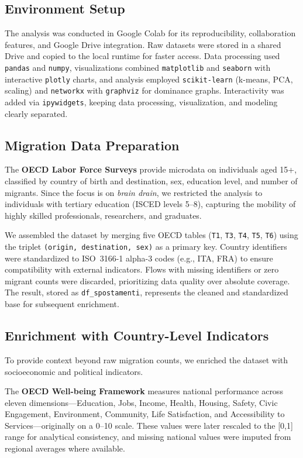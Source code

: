 \documentclass[11pt]{article}
\begin{document}
\subsection{Environment Setup}
The analysis was conducted in Google Colab for its reproducibility, collaboration features, and Google Drive integration. Raw datasets were stored in a shared Drive and copied to the local runtime for faster access. Data processing used \texttt{pandas} and \texttt{numpy}, visualizations combined \texttt{matplotlib} and \texttt{seaborn} with interactive \texttt{plotly} charts, and analysis employed \texttt{scikit-learn} (k-means, PCA, scaling) and \texttt{networkx} with \texttt{graphviz} for dominance graphs. Interactivity was added via \texttt{ipywidgets}, keeping data processing, visualization, and modeling clearly separated.


\subsection{Migration Data Preparation}
The \textbf {OECD Labor Force Surveys} provide microdata on individuals aged 15+, classified by country of birth and destination, sex, education level, and number of migrants. Since the focus is on \textit{brain drain}, we restricted the analysis to individuals with tertiary education (ISCED levels 5–8), capturing the mobility of highly skilled professionals, researchers, and graduates.

\noindent
We assembled the dataset by merging five OECD tables (\texttt{T1}, \texttt{T3}, \texttt{T4}, \texttt{T5}, \texttt{T6}) using the triplet \texttt{(origin, destination, sex)} as a primary key. Country identifiers were standardized to ISO~3166-1 alpha-3 codes (e.g., ITA, FRA) to ensure compatibility with external indicators. Flows with missing identifiers or zero migrant counts were discarded, prioritizing data quality over absolute coverage. The result, stored as \texttt{df\_spostamenti}, represents the cleaned and standardized base for subsequent enrichment.

\subsection{Enrichment with Country-Level Indicators}
To provide context beyond raw migration counts, we enriched the dataset with socioeconomic and political indicators.

\noindent
The \textbf{OECD Well-being Framework} measures national performance across eleven dimensions—Education, Jobs, Income, Health, Housing, Safety, Civic Engagement, Environment, Community, Life Satisfaction, and Accessibility to Services—originally on a 0–10 scale. These values were later rescaled to the [0,1] range for analytical consistency, and missing national values were imputed from regional averages where available.
\end{document}
